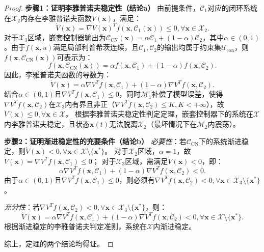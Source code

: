     \begin{proof}
    \textbf{步骤1：证明李雅普诺夫稳定性（结论a）}
    由前提条件，$\mathcal{C}_1$对应的闭环系统在$\mathcal{X}_2$内存在李雅普诺夫函数$V(\bm{x})$，满足：
    $$\dot{V}(\bm{x}) = \nabla V(\bm{x})^T f(\bm{x}, \mathcal{C}_1(\bm{x})) \leq 0, \forall \bm{x} \in \mathcal{X}_2.$$
    对于$\mathcal{X}_3$区域，嵌套控制器输出为$\mathcal{C}_{\text{CN}}(\bm{x}) = \alpha\mathcal{C}_1 + (1-\alpha)\mathcal{C}_2$，其中$\alpha \in (0,1)$。由于$f(\bm{x}, u)$满足局部利普希茨连续，且$\mathcal{C}_1, \mathcal{C}_2$的输出均属于约束集$\mathcal{U}_{\text{con}}$，则$f(\bm{x}, \mathcal{C}_{\text{CN}}(\bm{x}))$可表示为：
    $$f(\bm{x}, \mathcal{C}_{\text{CN}}(\bm{x})) = \alpha f(\bm{x}, \mathcal{C}_1) + (1-\alpha) f(\bm{x}, \mathcal{C}_2).$$
    因此，李雅普诺夫函数的导数为：
    $$\dot{V}(\bm{x}) = \alpha \nabla V^T f(\bm{x}, \mathcal{C}_1) + (1-\alpha) \nabla V^T f(\bm{x}, \mathcal{C}_2).$$
    结合$\alpha \in (0,1)$且$\nabla V^T f(\bm{x}, \mathcal{C}_1) \leq 0$，同时$\mathcal{M}_1$补偿了模型误差，使得$\nabla V^T f(\bm{x}, \mathcal{C}_2)$在$\mathcal{X}_3$内有界且非正（$\nabla V^T f(\bm{x}, \mathcal{C}_2) \leq K, K < +\infty$），故$\dot{V}(\bm{x}) \leq 0, \forall \bm{x} \in \mathcal{X}$。
    根据李雅普诺夫稳定性判定定理，嵌套控制器下的系统在$\mathcal{X}$内李雅普诺夫稳定，且状态$\bm{x}(t)$无法脱离$\mathcal{X}_2$（最坏情况下在$\mathcal{M}_2$内震荡）。

    \textbf{步骤2：证明渐进稳定性的充要条件（结论b）}
    \textit{必要性}：若$\mathcal{C}_{\text{CN}}$下的系统渐进稳定，则$\dot{V}(\bm{x}) < 0, \forall \bm{x} \in \mathcal{X} \setminus \{\bm{x}^*\}$。
    对于$\mathcal{X}_2$区域，$\alpha = 1$，故$\dot{V}(\bm{x}) = \nabla V^T f(\bm{x}, \mathcal{C}_1) \leq 0$；
    对于$\mathcal{X}_3$区域，需满足$\dot{V}(\bm{x}) < 0$，即：
    $$\alpha \nabla V^T f(\bm{x}, \mathcal{C}_1) + (1-\alpha) \nabla V^T f(\bm{x}, \mathcal{C}_2) < 0.$$
    由于$\alpha \in (0,1)$且$\nabla V^T f(\bm{x}, \mathcal{C}_1) \leq 0$，则必须有$\nabla V^T f(\bm{x}, \mathcal{C}_2) < 0, \forall \bm{x} \in \mathcal{X}_3 \setminus \{\bm{x}^*\}$。

    \textit{充分性}：若$\nabla V^T f(\bm{x}, \mathcal{C}_2) < 0, \forall \bm{x} \in \mathcal{X}_3 \setminus \{\bm{x}^*\}$，则：
    $$\dot{V}(\bm{x}) = \alpha \nabla V^T f(\bm{x}, \mathcal{C}_1) + (1-\alpha) \nabla V^T f(\bm{x}, \mathcal{C}_2) < 0, \forall \bm{x} \in \mathcal{X} \setminus \{\bm{x}^*\}.$$
    根据渐进稳定的李雅普诺夫判定准则，系统在$\mathcal{X}$内渐进稳定。

    综上，定理的两个结论均得证。
    \end{proof}

